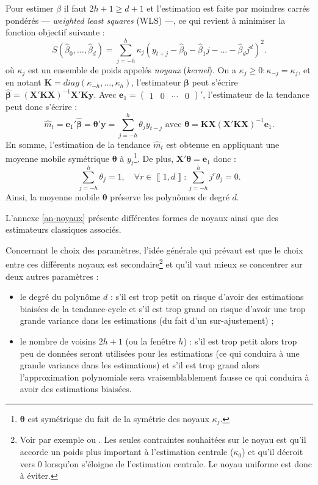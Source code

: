 \documentclass[
  12pt,
  a4paper,french]{article}
\newcommand\1{\mathds{1}}
\begin{document}
Pour estimer \(\beta\) il faut \(2h+1\geq d+1\) et l'estimation est faite par moindres carrés pondérés --- \emph{weighted least squares} (WLS) ---, ce qui revient à minimiser la fonction objectif suivante :
\[
S(\hat{\beta}_{0},\dots,\hat{\beta}_{d})=\sum_{j=-h}^{h}\kappa_{j}(y_{t+j}-\hat{\beta}_{0}-\hat{\beta}_{1}j-\dots-\hat{\beta}_{d}j^{d})^{2}.
\]
où \(\kappa_j\) est un ensemble de poids appelés \emph{noyaux} (\emph{kernel}).
On a \(\kappa_j\geq 0:\kappa_{-j}=\kappa_j\), et en notant \(\boldsymbol K=diag(\kappa_{-h},\dots,\kappa_{h})\), l'estimateur \(\boldsymbol \beta\) peut s'écrire \(\hat{\boldsymbol \beta}=(\boldsymbol X'\boldsymbol K\boldsymbol X)^{-1}\boldsymbol X'\boldsymbol K\boldsymbol y\).
Avec \(\boldsymbol e_{1}=\begin{pmatrix}1&0&\cdots&0\end{pmatrix}'\), l'estimateur de la tendance peut donc s'écrire :
\begin{equation}
\hat{m}_{t}=\boldsymbol e_{1}'\hat{\boldsymbol \beta}=\boldsymbol \theta'\boldsymbol y=\sum_{j=-h}^{h}\theta_{j}y_{t-j}\text{ avec }\boldsymbol \theta=\boldsymbol K\boldsymbol X(\boldsymbol X'\boldsymbol K\boldsymbol X)^{-1}\boldsymbol e_{1}.
\label{eq:mmsym}
\end{equation}
En somme, l'estimation de la tendance \(\hat{m}_{t}\) est obtenue en appliquant une moyenne mobile symétrique \(\boldsymbol \theta\) à \(y_t\)\footnote{
  \(\boldsymbol \theta\) est symétrique du fait de la symétrie des noyaux \(\kappa_j\).}.
De plus, \(\boldsymbol X'\boldsymbol \theta=\boldsymbol e_{1}\) donc :
\[
\sum_{j=-h}^{h}\theta_{j}=1,\quad\forall r\in\left\llbracket 1,d\right\rrbracket :\sum_{j=-h}^{h}j^{r}\theta_{j}=0.
\]
Ainsi, la moyenne mobile \(\boldsymbol \theta\) préserve les polynômes de degré \(d\).

L'annexe \ref{an-noyaux} présente différentes formes de noyaux ainsi que des estimateurs classiques associés.

Concernant le choix des paramètres, l'idée générale qui prévaut est que le choix entre ces différents noyaux est secondaire\footnote{
  Voir par exemple \textcite{cleveland1996smoothing} ou \textcite{Loader1999}.
  Les seules contraintes souhaitées sur le noyau est qu'il accorde un poids plus important à l'estimation centrale (\(\kappa_0\)) et qu'il décroit vers 0 lorsqu'on s'éloigne de l'estimation centrale.
  Le noyau uniforme est donc à éviter.} et qu'il vaut mieux se concentrer sur deux autres paramètres :

\begin{itemize}
\item
  le degré du polynôme \(d\) : s'il est trop petit on risque d'avoir des estimations biaisées de la tendance-cycle et s'il est trop grand on risque d'avoir une trop grande variance dans les estimations (du fait d'un sur-ajustement) ;
\item
  le nombre de voisins \(2h+1\) (ou la fenêtre \(h\)) : s'il est trop petit alors trop peu de données seront utilisées pour les estimations (ce qui conduira à une grande variance dans les estimations) et s'il est trop grand alors l'approximation polynomiale sera vraisemblablement fausse ce qui conduira à avoir des estimations biaisées.
\end{itemize}
\end{document}
